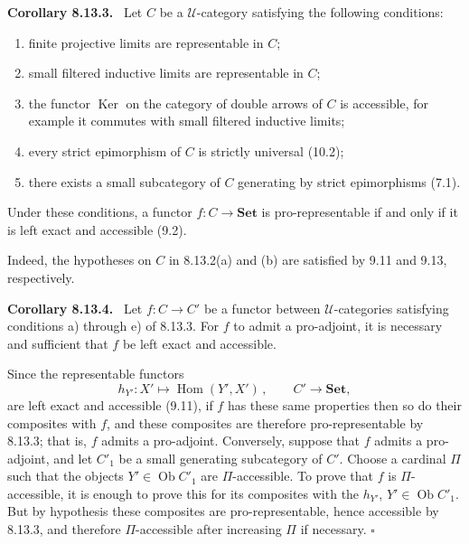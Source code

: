 \documentclass[11pt]{article}
\newcommand{\U}{\mathcal{U}}
\newcommand{\Set}{\mathbf{Set}}
\newcommand{\Ob}{\operatorname{Ob}}
\newcommand{\Hom}{\operatorname{Hom}}
\newcommand{\Ker}{\operatorname{Ker}}
\newcommand{\qedtext}{\hfill\(\square\)}
\newenvironment{statement}[1]{\par\medskip\noindent\textbf{#1.}\ }{\par\medskip}
\begin{document}
\begin{statement}{Corollary 8.13.3}
Let $C$ be a $\U$-category satisfying the following conditions:
\begin{enumerate}[label=\alph*)]
\item finite projective limits are representable in $C$;
\item small filtered inductive limits are representable in $C$;
\item the functor $\Ker$ on the category of double arrows of $C$ is accessible, for example it commutes with small filtered inductive limits;
\item every strict epimorphism of $C$ is strictly universal (10.2);
\item there exists a small subcategory of $C$ generating by strict epimorphisms (7.1).
\end{enumerate}
Under these conditions, a functor $f:C\to\Set$ is pro-representable if and only if it is left exact and accessible (9.2).
\end{statement}

Indeed, the hypotheses on $C$ in 8.13.2(a) and (b) are satisfied by 9.11 and 9.13, respectively.

\begin{statement}{Corollary 8.13.4}
Let $f:C\to C'$ be a functor between $\U$-categories satisfying conditions a) through e) of 8.13.3. For $f$ to admit a pro-adjoint, it is necessary and sufficient that $f$ be left exact and accessible.
\end{statement}

Since the representable functors
\[
 h_{Y'}:X'\longmapsto \Hom(Y',X')\,,\qquad C'\to\Set,
\]
are left exact and accessible (9.11), if $f$ has these same properties then so do their composites with $f$, and these composites are therefore pro-representable by 8.13.3; that is, $f$ admits a pro-adjoint. Conversely, suppose that $f$ admits a pro-adjoint, and let $C'_1$ be a small generating subcategory of $C'$. Choose a cardinal $\Pi$ such that the objects $Y'\in\Ob C'_1$ are $\Pi$-accessible. To prove that $f$ is $\Pi$-accessible, it is enough to prove this for its composites with the $h_{Y'}$, $Y'\in\Ob C'_1$. But by hypothesis these composites are pro-representable, hence accessible by 8.13.3, and therefore $\Pi$-accessible after increasing $\Pi$ if necessary. \qedtext

\bigskip
\end{document}
